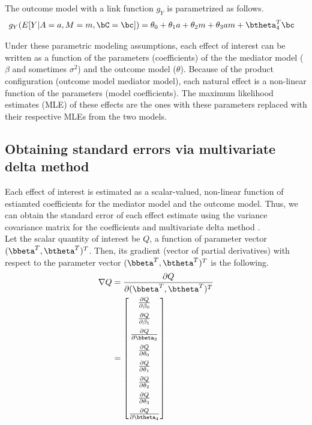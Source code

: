 \documentclass[10pt]{article}
\begin{document}
The outcome model with a link function \(g_{Y}\) is parametrized as follows.
\begin{align*}
  g_{Y}(E[Y|A=a,M=m,\bC=\bc]) &= \theta_{0} + \theta_{1}a + \theta_{2}m + \theta_{3}am + \btheta_{4}^{T}\bc
\end{align*}

Under these parametric modeling assumptions, each effect of interest can be written as a function of the parameters (coefficients) of the the mediator model (\(\beta\) and sometimes \(\sigma^{2}\)) and the outcome model (\(\theta\)). Because of the product configuration (outcome model \texttimes{} mediator model), each natural effect is a non-linear function of the parameters (model coefficients). The maximum likelihood estimates (MLE) of these effects are the ones with these parameters replaced with their respective MLEs from the two models.

\subsection{Obtaining standard errors via multivariate delta method}
\label{sec:org8f9939f}

Each effect of interest is estimated as a scalar-valued, non-linear function of estiamted coefficients for the mediator model and the outcome model. Thus, we can obtain the standard error of each effect estimate using the variance covariance matrix for the coefficients and multivariate delta method \cite{hoefWhoInventedDelta2012}.\\

Let the scalar quantity of interest be \(Q\), a function of parameter vector \((\bbeta^{T},\btheta^{T})^{T}\). Then, its gradient (vector of partial derivatives) with respect to the parameter vector \((\bbeta^{T},\btheta^{T})^{T}\) is the following.\\

\begin{align*}
\nabla Q &= \frac{\partial Q}{\partial (\bbeta^{T},\btheta^{T})^{T}}\\
         &= \begin{bmatrix}
           \frac{\partial Q}{\partial \beta_{0}}\\[6pt]
           \frac{\partial Q}{\partial \beta_{1}}\\[6pt]
           \frac{\partial Q}{\partial \bbeta_{2}}\\[6pt]
           \frac{\partial Q}{\partial \theta_{0}}\\[6pt]
           \frac{\partial Q}{\partial \theta_{1}}\\[6pt]
           \frac{\partial Q}{\partial \theta_{2}}\\[6pt]
           \frac{\partial Q}{\partial \theta_{3}}\\[6pt]
           \frac{\partial Q}{\partial \btheta_{4}}\\
         \end{bmatrix}\\
\end{align*}
\end{document}
